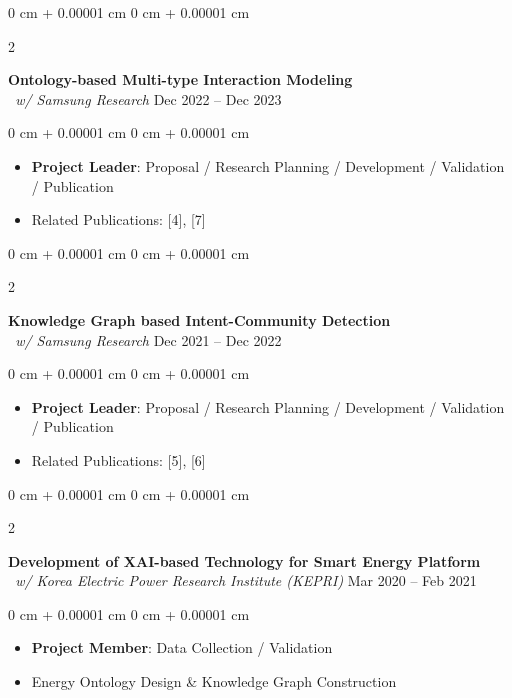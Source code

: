 \documentclass[10pt, letterpaper]{article}
\newenvironment{highlights}{
	\begin{itemize}[
		topsep=0.10 cm,
		parsep=0.10 cm,
		partopsep=0pt,
		itemsep=0pt,
		leftmargin=0 cm + 10pt
		]
	}{
	\end{itemize}
} %
\newenvironment{onecolentry}{
	\begin{adjustwidth}{
			0 cm + 0.00001 cm
		}{
			0 cm + 0.00001 cm
		}
	}{
	\end{adjustwidth}
} %
\newenvironment{twocolentry}[2][]{
	\onecolentry
	\def\secondColumn{#2}
	\setcolumnwidth{\fill, 4.5 cm}
	\begin{paracol}{2}
	}{
		\switchcolumn \raggedleft \secondColumn
	\end{paracol}
	\endonecolentry
} %
\begin{document}
	
	\begin{twocolentry}{
			Dec 2022 – Dec 2023
		}
		\textbf{Ontology-based Multi-type Interaction Modeling}\\ 
		\textit{\ w/ Samsung Research}\end{twocolentry}
	\begin{onecolentry}
		\begin{highlights}
			\item \textbf{Project Leader}: Proposal / Research Planning / Development / Validation / Publication 
			\item Related Publications: [4], [7] 
		\end{highlights}
	\end{onecolentry}
	\vspace{0.20 cm}	
	
	
	\begin{twocolentry}{
			Dec 2021 – Dec 2022
		}
		\textbf{Knowledge Graph based Intent-Community Detection}\\ 
		\textit{\ w/ Samsung Research}\end{twocolentry}
	\begin{onecolentry}
		\begin{highlights}
			\item \textbf{Project Leader}: Proposal / Research Planning / Development / Validation / Publication
			\item Related Publications: [5], [6] 
		\end{highlights}
	\end{onecolentry}
	\vspace{0.20 cm}
	
	
	\begin{twocolentry}{
			Mar 2020 – Feb 2021
		}
		\textbf{Development of XAI-based Technology for Smart Energy Platform}\\ 
		\textit{\ w/ Korea Electric Power Research Institute (KEPRI)}\end{twocolentry}
	\begin{onecolentry}
		\begin{highlights}
			\item \textbf{Project Member}: Data Collection / Validation 
			\item Energy Ontology Design \& Knowledge Graph Construction
		\end{highlights}
	\end{onecolentry}
	
\end{document}
